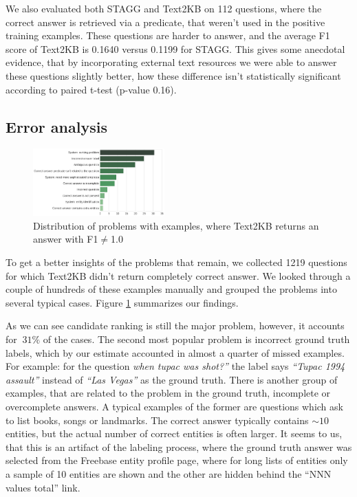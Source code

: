 We also evaluated both STAGG and Text2KB on 112 questions, where the correct answer is retrieved via a predicate, that weren't used in the positive training examples.
These questions are harder to answer, and the average F1 score of Text2KB is 0.1640 versus 0.1199 for STAGG.
This gives some anecdotal evidence, that by incorporating external text resources we were able to answer these questions slightly better, how these difference isn't statistically significant according to paired t-test (p-value 0.16).

\subsection{Error analysis}

\begin{figure}
\centering
\includegraphics[width=0.45\textwidth]{img/error_analysis}
\caption{Distribution of problems with examples, where Text2KB returns an answer with F1$\neq$1.0}
\label{fig:error_analysis}
\end{figure}

To get a better insights of the problems that remain, we collected 1219 questions for which Text2KB didn't return completely correct answer.
We looked through a couple of hundreds of these examples manually and grouped the problems into several typical cases.
Figure \ref{fig:error_analysis} summarizes our findings.

As we can see candidate ranking is still the major problem, however, it accounts for $~31\%$ of the cases.
The second most popular problem is incorrect ground truth labels, which by our estimate accounted in almost a quarter of missed examples.
For example: for the question \textit{when tupac was shot?''} the label says \textit{``Tupac 1994 assault''} instead of \textit{``Las Vegas''} as the ground truth.
There is another group of examples, that are related to the problem in the ground truth, \ie incomplete or overcomplete answers.
A typical examples of the former are questions which ask to list books, songs or landmarks.
The correct answer typically contains $\sim10$ entities, but the actual number of correct entities is often larger.
It seems to us, that this is an artifact of the labeling process, where the ground truth answer was selected from the Freebase entity profile page, where for long lists of entities only a sample of 10 entities are shown and the other are hidden behind the ``NNN values total'' link.

